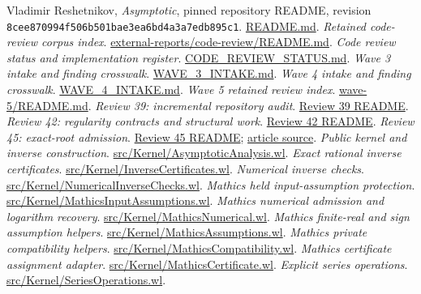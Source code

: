 \documentclass[11pt,letterpaper]{article}
\newcommand{\pin}{8cee870994f506b501bae3ea6bd4a3a7edb895c1}
\newcommand{\src}[2]{\href{https://github.com/VladimirReshetnikov/Asymptotic/blob/8cee870994f506b501bae3ea6bd4a3a7edb895c1/#1}{#2}}
\begin{document}
\begin{thebibliography}{99}
\small\raggedright
{} Vladimir Reshetnikov, \emph{Asymptotic}, pinned repository README, revision \texttt{\pin}. \src{README.md}{README.md}.
 \emph{Retained code-review corpus index}. \src{external-reports/code-review/README.md}{external-reports/code-review/README.md}.
 \emph{Code review status and implementation register}. \src{docs/development/CODE_REVIEW_STATUS.md}{CODE\_REVIEW\_STATUS.md}.
 \emph{Wave 3 intake and finding crosswalk}. \src{docs/development/WAVE_3_INTAKE.md}{WAVE\_3\_INTAKE.md}.
 \emph{Wave 4 intake and finding crosswalk}. \src{docs/development/WAVE_4_INTAKE.md}{WAVE\_4\_INTAKE.md}.
 \emph{Wave 5 retained review index}. \src{external-reports/code-review/wave-5/README.md}{wave-5/README.md}.
 \emph{Review 39: incremental repository audit}. \src{external-reports/code-review/wave-5/code-review-39/README.md}{Review 39 README}.
 \emph{Review 42: regularity contracts and structural work}. \src{external-reports/code-review/wave-5/code-review-42/README.md}{Review 42 README}.
 \emph{Review 45: exact-root admission}. \src{external-reports/code-review/wave-5/code-review-45/README.md}{Review 45 README}; \src{external-reports/code-review/wave-5/code-review-45/article/review.tex}{article source}.
 \emph{Public kernel and inverse construction}. \src{src/Kernel/AsymptoticAnalysis.wl}{src/Kernel/AsymptoticAnalysis.wl}.
 \emph{Exact rational inverse certificates}. \src{src/Kernel/InverseCertificates.wl}{src/Kernel/InverseCertificates.wl}.
 \emph{Numerical inverse checks}. \src{src/Kernel/NumericalInverseChecks.wl}{src/Kernel/NumericalInverseChecks.wl}.
 \emph{Mathics held input-assumption protection}. \src{src/Kernel/MathicsInputAssumptions.wl}{src/Kernel/MathicsInputAssumptions.wl}.
 \emph{Mathics numerical admission and logarithm recovery}. \src{src/Kernel/MathicsNumerical.wl}{src/Kernel/MathicsNumerical.wl}.
 \emph{Mathics finite-real and sign assumption helpers}. \src{src/Kernel/MathicsAssumptions.wl}{src/Kernel/MathicsAssumptions.wl}.
 \emph{Mathics private compatibility helpers}. \src{src/Kernel/MathicsCompatibility.wl}{src/Kernel/MathicsCompatibility.wl}.
 \emph{Mathics certificate assignment adapter}. \src{src/Kernel/MathicsCertificate.wl}{src/Kernel/MathicsCertificate.wl}.
 \emph{Explicit series operations}. \src{src/Kernel/SeriesOperations.wl}{src/Kernel/SeriesOperations.wl}.

\end{thebibliography}
\end{document}
